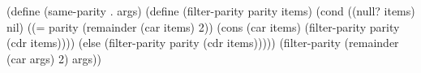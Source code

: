 \begtt\scm
(define (same-parity . args)
  (define (filter-parity parity items)  
    (cond ((null? items) nil)
          ((= parity (remainder (car items) 2))
           (cons (car items) (filter-parity parity (cdr items))))
          (else (filter-parity parity (cdr items)))))
  (filter-parity (remainder (car args) 2) args))
\endtt
